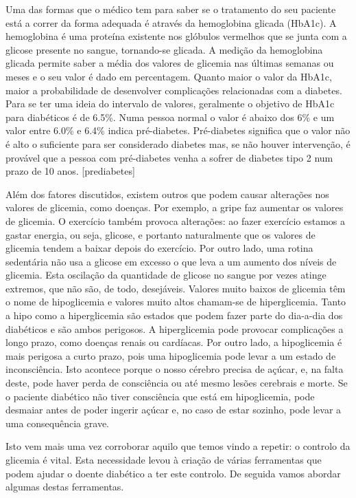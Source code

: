 Uma das formas que o médico tem para saber se o tratamento do seu paciente está a correr da forma adequada é através da hemoglobina glicada (HbA1c). A hemoglobina é uma proteína existente nos glóbulos vermelhos que se junta com a glicose presente no sangue, tornando-se glicada. A medição da hemoglobina glicada permite saber a média dos valores de glicemia nas últimas semanas ou meses e o seu valor é dado em percentagem. Quanto maior o valor da HbA1c, maior a probabilidade de desenvolver complicações relacionadas com a diabetes.
Para se ter uma ideia do intervalo de valores, geralmente o objetivo de HbA1c para diabéticos é de 6.5\%. Numa pessoa normal o valor é abaixo dos 6\% e um valor entre 6.0\% e 6.4\% indica pré-diabetes. Pré-diabetes significa que o valor não é alto o suficiente para ser considerado diabetes mas, se não houver intervenção, é provável que a pessoa com pré-diabetes venha a sofrer de diabetes tipo 2 num prazo de 10 anos. [prediabetes]

Além dos fatores discutidos, existem outros que podem causar alterações nos valores de glicemia, como doenças. Por exemplo, a gripe faz aumentar os valores de glicemia. O exercício também provoca alterações: ao fazer exercício estamos a gastar energia, ou seja, glicose, e portanto naturalmente que os valores de glicemia tendem a baixar depois do exercício. Por outro lado, uma rotina sedentária não usa a glicose em excesso o que leva a um aumento dos níveis de glicemia. Esta oscilação da quantidade de glicose no sangue por vezes atinge extremos, que não são, de todo, desejáveis. Valores muito baixos de glicemia têm o nome de hipoglicemia e valores muito altos chamam-se de hiperglicemia.
Tanto a hipo como a hiperglicemia são estados que podem fazer parte do dia-a-dia dos diabéticos e são ambos perigosos.  A hiperglicemia pode provocar complicações a longo prazo, como doenças renais ou cardíacas. Por outro lado, a hipoglicemia é mais perigosa a curto prazo, pois uma hipoglicemia pode levar a um estado de inconsciência. Isto acontece porque o nosso cérebro precisa de açúcar, e, na falta deste, pode haver perda de consciência ou até mesmo lesões cerebrais e morte. Se o paciente diabético não tiver consciência que está em hipoglicemia, pode desmaiar antes de poder ingerir açúcar e, no caso de estar sozinho, pode levar a uma consequência grave.

Isto vem mais uma vez corroborar aquilo que temos vindo a repetir: o controlo da glicemia é vital. Esta necessidade levou à criação de várias ferramentas que podem ajudar o doente diabético a ter este controlo. De seguida vamos abordar algumas destas ferramentas.


